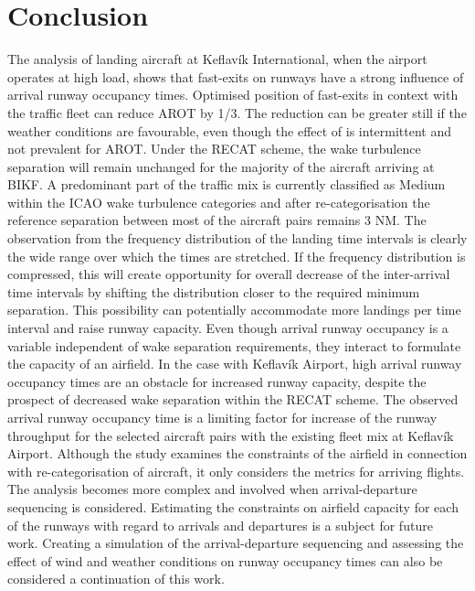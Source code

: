 \section{Conclusion\label{sec:conclusions}}
The analysis of landing aircraft at Keflavík International, when the airport operates at high load, shows that fast-exits on runways have a strong influence of arrival runway occupancy times. Optimised position of fast-exits in context with the traffic fleet can reduce AROT by 1/3. The reduction can be greater still if the weather conditions are favourable, even though the effect of is intermittent and not prevalent for AROT.
Under the RECAT scheme, the wake turbulence separation will remain unchanged for the majority of the aircraft arriving at BIKF. A predominant part of the traffic mix is currently classified as Medium within the ICAO wake turbulence categories and after re-categorisation the reference separation between most of the aircraft pairs remains 3 NM. The observation from the frequency distribution of the landing time intervals is clearly the wide range over which the times are stretched. If the frequency distribution is compressed, this will create opportunity for overall decrease of the inter-arrival time intervals by shifting the distribution closer to the required minimum separation. This possibility can potentially accommodate more landings per time interval and raise runway capacity.
Even though arrival runway occupancy is a variable independent of wake separation requirements, they interact to formulate the capacity of an airfield. In the case with Keflavík Airport, high arrival runway occupancy times are an obstacle for increased runway capacity, despite the prospect of decreased wake separation within the RECAT scheme. The observed arrival runway occupancy time is a limiting factor for increase of the runway throughput for the selected aircraft pairs with the existing fleet mix at Keflavík Airport.
Although the study examines the constraints of the airfield in connection with re-categorisation of aircraft, it only considers the metrics for arriving flights. The analysis becomes more complex and involved when arrival-departure sequencing is considered. Estimating the constraints on airfield capacity for each of the runways with regard to arrivals and departures is a subject for future work. Creating a simulation of the arrival-departure sequencing and assessing the effect of wind and weather conditions on runway occupancy times can also be considered a continuation of this work.



